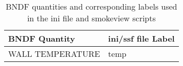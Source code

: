 \begin{table}[bph]
\begin{center}
\caption{BNDF quantities and corresponding labels used in the ini file and smokeview scripts}
\vspace{0.1in}
\begin{tabular}{|l|l|}
\hline
BNDF Quantity & ini/ssf file Label \\ \hline
{\ct  WALL TEMPERATURE } & {\ct   temp } \\ \hline
\end{tabular}
\label{tabBNDF}
\end{center}
\end{table}
